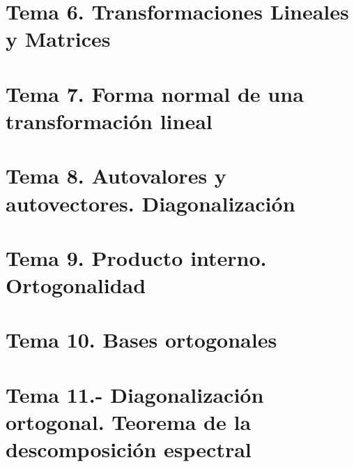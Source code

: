 \documentclass[12pt, twoside, openright]{report} %
\begin{document}
\part{Tema 6. Transformaciones Lineales y Matrices}




\part{Tema 7. Forma normal de una transformación lineal}




\part{Tema 8. Autovalores  y autovectores. Diagonalización}






\part{Tema 9. Producto interno. Ortogonalidad}





\part{Tema 10. Bases ortogonales}




\part{Tema 11.- Diagonalización ortogonal. Teorema de la descomposición espectral}




\end{document}
